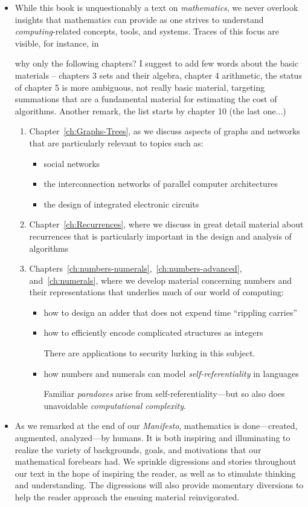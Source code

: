 \begin{itemize}
\item
While this book is unquestionably a text on {\em mathematics}, we
never overlook insights that mathematics can provide as one strives to
understand {\em computing}-related concepts, tools, and systems.
Traces of this focus are visible, for instance, in

{\Denis why only the following chapters? I suggest to add few words about the basic materials -- chapters 3 sets and their algebra, 
chapter 4 arithmetic, the status of chapter 5 is more ambiguous, not really basic material, targeting summations that are 
a fundamental material for estimating the cost of algorithms.
Another remark, the list starts by chapter 10 (the last one...)}
  \begin{enumerate}
  \item
Chapter~\ref{ch:Graphs-Trees}, as we discuss aspects of graphs and
networks that are particularly relevant to topics such as:
     \begin{itemize}
     \item
social networks
     \item
the interconnection networks of parallel computer architectures
     \item
the design of integrated electronic circuits
     \end{itemize}
  \item
Chapter~\ref{ch:Recurrences}, where we discuss in great detail
material about recurrences that is particularly important in the
design and analysis of algorithms
  \item
Chapters~\ref{ch:numbers-numerals},~\ref{ch:numbers-advanced},
and~\ref{ch:numerals}, where we develop material concerning numbers
and their representations that underlies much of our world of
computing:
     \begin{itemize}
     \item
how to design an adder that does not expend time ``rippling carries''
     \item
how to efficiently encode complicated structures as integers

There are applications to security lurking in this subject.
     \item
how numbers and numerals can model {\em self-referentiality} in
languages

Familiar {\it paradoxes} arise from self-referentiality---but so also
does unavoidable {\em computational complexity}.
     \end{itemize}
  \end{enumerate}
\item
As we remarked at the end of our {\it Manifesto}, mathematics is
done---created, augmented, analyzed---by humans.  It is both inspiring
and illuminating to realize the variety of backgrounds, goals, and
motivations that our mathematical forebears had.  We sprinkle
digressions and stories throughout our text in the hope of inspiring
the reader, as well as to stimulate thinking and understanding.  The
digressions will also provide momentary diversions to help the reader
approach the ensuing material reinvigorated.


\end{itemize}

